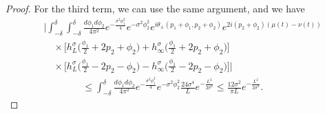 \documentclass[../thesis-main/thesis-main]{subfiles}
\begin{document}
\begin{proof}
For the third term, we can use the same argument, and we have
\begin{align}
    &\Bigg | \int_{-\delta}^\delta \int_{-\delta}^\delta \frac{d\phi_1 d\phi_2}{4\pi^2} e^{- \frac{\sigma^2 \phi_1^2}{4}}e^{-\sigma^2 \phi_2^2} e^{ i \theta_{\pm}(p_1+\phi_1, p_2+\phi_2)} e^{ 2 i( p_2 + \phi_2)(\mu(t) - \nu(t))}   \nonumber\\
   &\quad \times\Big[h_L^{\sigma} \Big(\frac{\phi_1}{2} + 2p_2 +\phi_2 \Big)  + h_\infty^\sigma \Big(\frac{\phi_1}{2} + 2p_2+ \phi_2 \Big)\Big]\nonumber\\
   &\quad \times\Big[ h_{L}^\sigma\Big(\frac{\phi_1}{2} -2p_2 - \phi_2 \Big) - h_\infty^\sigma\Big(\frac{\phi_1}{2} -2p_2- \phi_2\Big)\Big]\Bigg|\nonumber\\
   &\qquad \qquad \leq \int_{-\delta}^\delta \frac{d\phi_1 d\phi_2}{4\pi^2} e^{- \frac{\sigma^2 \phi_1^2}{4}}e^{-\sigma^2 \phi_2^2} \frac{24 \sigma^4}{L} e^{ - \frac{L^2}{2\sigma^2}} \leq \frac{ 12 \sigma^2}{\pi L} e^{ - \frac{L^2}{2\sigma^2}}.
\end{align}


\end{proof}
\end{document}
